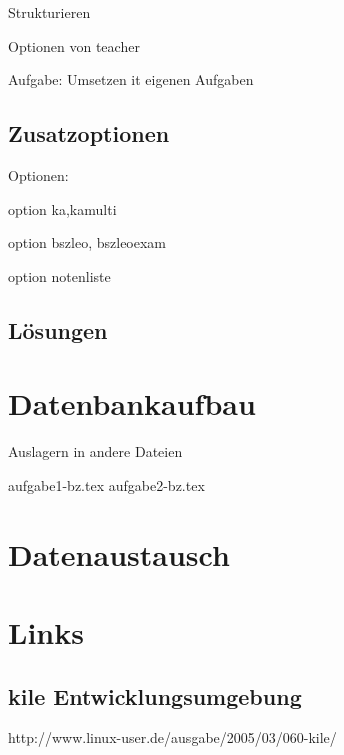 \documentclass{article}
\begin{document}
Strukturieren

Optionen von teacher



Aufgabe: Umsetzen it eigenen Aufgaben


\subsection{Zusatzoptionen}

Optionen:

option ka,kamulti

option bszleo, bszleoexam

option notenliste


\subsection{Lösungen}




\section{Datenbankaufbau}

Auslagern in andere Dateien

aufgabe1-bz.tex
aufgabe2-bz.tex



\section{Datenaustausch}





\section{Links}

\subsection{kile Entwicklungsumgebung}

http://www.linux-user.de/ausgabe/2005/03/060-kile/
\end{document}
